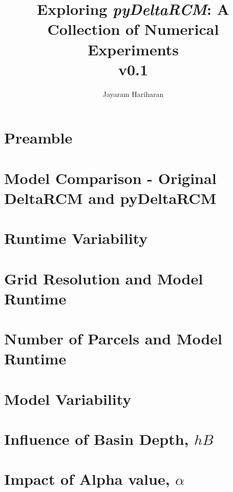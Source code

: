 \documentclass[letterpaper, oneside, final]{memoir}
\begin{document}
\title{Exploring \textit{pyDeltaRCM}: A Collection of Numerical Experiments\\\small{v0.1}}
\author{Jayaram Hariharan}
\maketitle

\tableofcontents

\chapter{Preamble}


\chapter{Model Comparison - Original DeltaRCM and pyDeltaRCM}


\chapter{Runtime Variability}


\chapter{Grid Resolution and Model Runtime}

\label{chap:resruntime}

\chapter{Number of Parcels and Model Runtime}

\label{chap:npruntime}

\chapter{Model Variability}


\chapter{Influence of Basin Depth, $hB$}


\chapter{Impact of Alpha value, $\alpha$}

\end{document}
